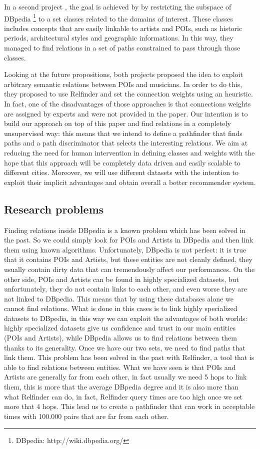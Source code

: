 \documentclass[paper=a4, fontsize=11pt]{scrartcl}
\begin{document}
In a second project \cite{Kaminskas:2012:KMR:2390848.2390854}, the goal is achieved by by restricting the subspace of DBpedia \footnote{DBpedia: http://wiki.dbpedia.org/} to a set classes related to the domains of interest. These classes includes concepts that are easily linkable to artists and POIs, such as historic periods, architectural styles and geographic informations. In this way, they managed to find relations in a set of paths constrained to pass through those classes.

Looking at the future propositions, both projects proposed the idea to exploit arbitrary semantic relations between POIs and musicians.
In order to do this, they proposed to use Relfinder \cite{Heim:2009:RRR:1695324.1695351} and set the connection weights using an heuristic. In fact, one of the disadvantages of those approaches is that connections weights are assigned by experts and were not provided in the paper.
Our intention is to build our approach on top of this paper and find relations in a completely unsupervised way: this means that we intend to define a pathfinder that finds paths and a path discriminator that selects the interesting relations. We aim at reducing the need for human intervention in defining classes and weights with the hope that this approach will be completely data driven and easily scalable to different cities. Moreover, we will use different datasets with the intention to exploit their implicit advantages and obtain overall a better recommender system.

\subsection{Research problems}
Finding relations inside DBpedia is a known problem which has been solved in the past. So we could simply look for POIs and Artists in DBpedia and then link them using known algorithms.
Unfortunately, DBpedia is not perfect: it is true that it contains POIs and Artists, but these entities are not cleanly defined, they usually contain dirty data that can tremendously affect our performances.
On the other side, POIs and Artists can be found in highly specialized datasets, but unfortunately, they do not contain links to each other, and even worse they are not linked to DBpedia. This means that by using these databases alone we cannot find relations.
What is done in this cases is to link highly specialized datasets to DBpedia, in this way we can exploit the advantages of both worlds: highly specialized datasets give us confidence and trust in our main entities (POIs and Artists), while DBpedia allows us to find relations between them thanks to its generality.
Once we have our two sets, we need to find paths that link them. This problem has been solved in the past with Relfinder, a tool that is able to find relations between entities.
What we have seen is that POIs and Artists are generally far from each other, in fact usually we need 5 hops to link them, this is more that the average DBpedia degree and it is also more than what Relfinder can do, in fact, Relfinder query times are too high once we set more that 4 hops. This lead us to create a pathfinder that can work in acceptable times with 100.000 pairs that are far from each other.
\end{document}
